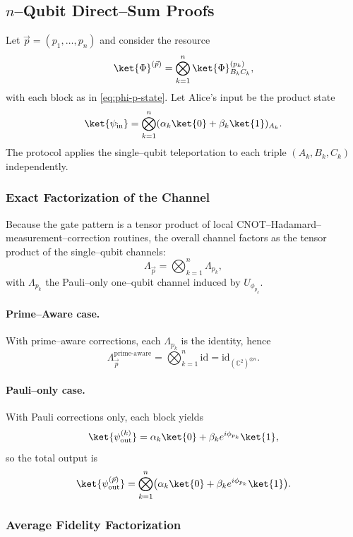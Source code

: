 \documentclass[11pt]{article}
\begin{document}
\subsection{\texorpdfstring{$n$}{n}–Qubit Direct–Sum Proofs}

Let $\vec p=(p_1,\dots,p_n)$ and consider the resource
\[
  \ket{\Phi}^{(\vec p)}
  = \bigotimes_{k=1}^n \ket{\Phi}^{(p_k)}_{B_kC_k},
\]
with each block as in \eqref{eq:phi-p-state}. Let Alice's input be the product state
\[
  \ket{\psi_{\mathrm{in}}}
  = \bigotimes_{k=1}^n (\alpha_k\ket{0}+\beta_k\ket{1})_{A_k}.
\]
The protocol applies the single–qubit teleportation to each triple $(A_k,B_k,C_k)$ independently.

\subsubsection{Exact Factorization of the Channel}

Because the gate pattern is a tensor product of local CNOT–Hadamard–measurement–correction routines, the overall channel factors as the tensor product of the single–qubit channels:
\[
  \Lambda_{\vec p}
  = \bigotimes_{k=1}^n \Lambda_{p_k},
\]
with $\Lambda_{p_k}$ the Pauli–only one–qubit channel induced by $U_{\phi_{p_k}}$.

\paragraph{Prime–Aware case.}
With prime–aware corrections, each $\Lambda_{p_k}$ is the identity, hence
\[
  \Lambda_{\vec p}^{\text{prime-aware}}
  = \bigotimes_{k=1}^n \mathrm{id}
  = \mathrm{id}_{(\mathbb{C}^2)^{\otimes n}}.
\]

\paragraph{Pauli–only case.}
With Pauli corrections only, each block yields
\[
  \ket{\psi^{(k)}_{\text{out}}}
  = \alpha_k\ket{0} + \beta_k e^{i\phi_{p_k}}\ket{1},
\]
so the total output is
\[
  \ket{\psi_{\text{out}}^{(\vec p)}}
  = \bigotimes_{k=1}^n
    \bigl(\alpha_k\ket{0} + \beta_k e^{i\phi_{p_k}}\ket{1}\bigr).
\]

\subsubsection{Average Fidelity Factorization}
\end{document}
